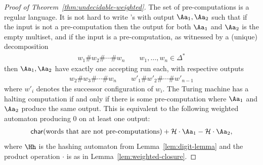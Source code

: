 \begin{proof}[Proof of Theorem~\ref{thm:undecidable-weighted}]
The set of pre-computations is  a regular language. It  is  not hard  to write \nfa's with output $\Aa_1,\Aa_2$ such that if  the  input is not a pre-computation then the output for both $\Aa_1$ and $\Aa_2$  is the empty multiset, and if the input is a pre-computation, as witnessed by a (unique) decomposition
\begin{align*}
  w_1 \# w_2 \# \cdots \# w_n \qquad w_1,\ldots,w_n \in \Delta^*
\end{align*}
 then $\Aa_1,\Aa_2$ have exactly one accepting run each,  with respective outputs
 \begin{align*}
  w_2\#w_3 \# \cdots \#w_n \qquad 
 w'_1\# w'_2 \# \cdots \#w'_{n-1} 
\end{align*}
where $w'_i$ denotes the successor configuration of $w_i$. 
  The Turing machine has a halting computation if and only if  there is some  pre-computation where  $\Aa_1$ and $\Aa_2$ produce the same output.  This is equivalent to the following weighted automaton producing $0$ on at least one output:
  \begin{align*}
  \mathsf{char}(\text{words that are not pre-computations}) + \mathcal{H} \cdot \Aa_1  - \mathcal{H}  \cdot \Aa_2,
\end{align*}
where $\Hh$ is the hashing  automaton from Lemma~\ref{lem:digit-lemma} and  the product operation $\cdot$ is as in Lemma~\ref{lem:weighted-closure}.
\end{proof}